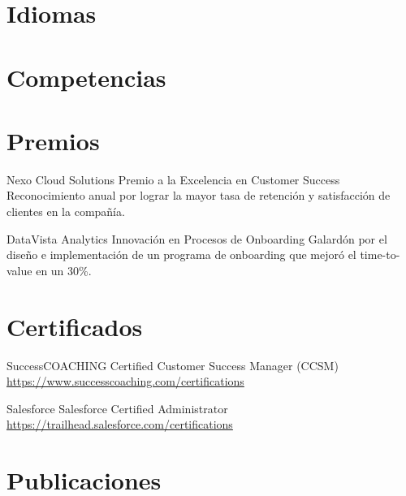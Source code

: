 \documentclass[a4paper, serif, 10pt]{moderncv}
\begin{document}
\section{Idiomas}

\section{Competencias}

\section{Premios}

        {Nexo Cloud Solutions}
        {Premio a la Excelencia en Customer Success}
        {}
        {}
        {Reconocimiento anual por lograr la mayor tasa de retención y satisfacción de clientes en la compañía.}

        {DataVista Analytics}
        {Innovación en Procesos de Onboarding}
        {}
        {}
        {Galardón por el diseño e implementación de un programa de onboarding que mejoró el time-to-value en un 30\%.}
\section{Certificados}

        {SuccessCOACHING}
        {Certified Customer Success Manager (CCSM)}
        {\url{https://www.successcoaching.com/certifications}}
        {}
        {}

        {Salesforce}
        {Salesforce Certified Administrator}
        {\url{https://trailhead.salesforce.com/certifications}}
        {}
        {}
\section{Publicaciones}
\end{document}
